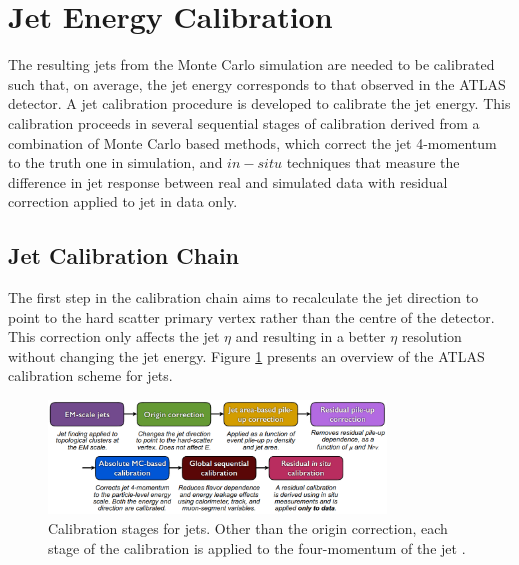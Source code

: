 \section{Jet Energy Calibration}
\label{Jet:Cal}
The resulting jets from the Monte Carlo simulation are needed to be calibrated such that, on average, the jet energy corresponds to that observed in the ATLAS detector. A jet calibration procedure is developed to calibrate the jet energy. This calibration proceeds in several sequential stages of calibration derived from a combination of Monte Carlo based methods, which correct the jet 4-momentum to the truth one in simulation, and $in-situ$ techniques that measure the difference in jet response between real and simulated data with residual correction applied to jet in data only.

\subsection{Jet Calibration Chain}
\label{Jet:Cal:chain}
 The first step in the calibration chain aims to recalculate the jet direction to point to the hard scatter primary vertex rather than the centre of the detector. This correction only affects the jet $\eta$ and resulting in a better $\eta$ resolution without changing the jet energy. Figure \ref{fig:Jet:Cal:chain} presents an overview of the ATLAS calibration scheme for jets.
\begin{figure}[htbp]
     \centering
     \includegraphics[width=0.8\textwidth]{Ch4/Img/calibration_chain.png}
     \caption{Calibration stages for jets. Other than the origin correction, each stage of the calibration is applied to the four-momentum of the jet \cite{JES_Sys_13_TeV}.}
     \label{fig:Jet:Cal:chain}
 \end{figure}

